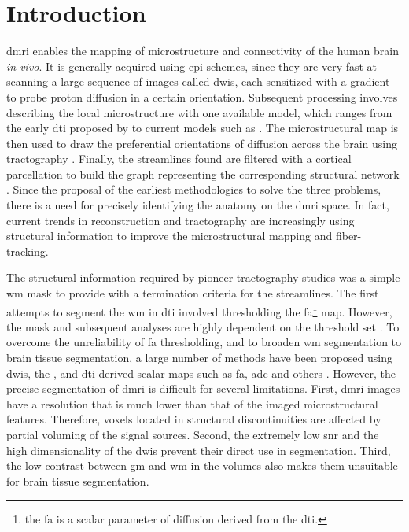 \section{Introduction}\label{sec:introduction}
\Gls*{dmri} enables the mapping of microstructure \citep{basser_microstructural_1996}
  and connectivity \citep{craddock_imaging_2013} of the human brain \emph{in-vivo}.
It is generally acquired using \gls*{epi} schemes, since they are very fast at
  scanning a large sequence of images called \glspl*{dwi}, each sensitized with
  a gradient to probe proton diffusion in a certain orientation.
Subsequent processing involves describing the local microstructure with one available
  model, which ranges from the early \gls*{dti} proposed by \cite{basser_microstructural_1996}
  to current models such as \citep{daducci_accelerated_2015}.
The microstructural map is then used to draw the preferential orientations of diffusion
  across the brain using tractography \citep{mori_threedimensional_1999}.
Finally, the streamlines found are filtered with a cortical parcellation
  to build the graph representing the corresponding structural
  network \citep{hagmann_mapping_2008}.
Since the proposal of the earliest methodologies to solve the three problems,
  there is a need for precisely identifying the anatomy on the \gls*{dmri} space.
In fact, current trends in reconstruction \citep{jeurissen_multitissue_2014} and
  tractography \citep{smith_anatomicallyconstrained_2012} are increasingly using
  structural information to improve the microstructural mapping and fiber-tracking.

The structural information required by pioneer tractography studies was a simple
  \gls*{wm} mask to provide with a termination criteria for the streamlines.
The first attempts to segment the \gls*{wm} in \gls*{dti} involved thresholding the
  \gls*{fa}\footnote{the \gls*{fa} is a scalar parameter of diffusion derived from
  the \gls*{dti}.} map.
However, the mask and subsequent analyses are highly dependent on the threshold set
  \citep{taoka_fractional_2009}.
To overcome the unreliability of \gls*{fa} thresholding, and to broaden
  \gls*{wm} segmentation to brain tissue segmentation, a large number of
  methods have been proposed using \glspl*{dwi}, the \lowb{}, and \gls*{dti}-derived
  scalar maps such as \gls*{fa}, \gls*{adc} and others \citep{zhukov_level_2003,
  rousson_level_2004,jonasson_segmentation_2005,liu_brain_2007,hadjiprocopis_unbiased_2005,
  lu_segmentation_2008,han_experimental_2009}.
However, the precise segmentation of \gls*{dmri} is difficult for several limitations.
First, \gls{dmri} images have a resolution that is much lower than that of the imaged
  microstructural features.
Therefore, voxels located in structural discontinuities are affected by partial
  voluming of the signal sources.
Second, the extremely low \gls*{snr} and the high dimensionality of the \glspl*{dwi} prevent
  their direct use in segmentation.
Third, the low contrast between \gls*{gm} and \gls*{wm} in the \lowb{} volumes also makes
  them unsuitable for brain tissue segmentation.

